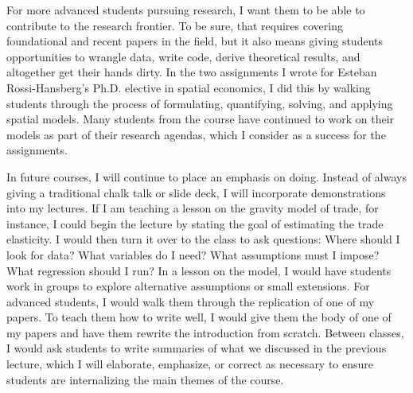 \documentclass{jmstatement}
\begin{document}
For more advanced students pursuing research, I want them to be able to contribute
to the research frontier.
To be sure, that requires covering foundational and recent papers in the field,
but it also means giving students opportunities to wrangle data, write code,
derive theoretical results, and altogether get their hands dirty.
In the two assignments I wrote for Esteban Rossi-Hansberg's Ph.D. elective in
spatial economics, I did this by walking students through the process of
formulating, quantifying, solving, and applying spatial models.
Many students from the course have continued to work on their models as part
of their research agendas, which I consider as a success for the assignments.


In future courses, I will continue to place an emphasis on doing.
Instead of always giving a traditional chalk talk or slide deck, I will incorporate
demonstrations into my lectures.
If I am teaching a lesson on the gravity model of trade, for instance,
I could begin the lecture by stating the goal of estimating the trade elasticity.
I would then turn it over to the class to ask questions:
Where should I look for data?
What variables do I need?
What assumptions must I impose?
What regression should I run?
In a lesson on the \citet{EatonKortum2002} model, I would have students work
in groups to explore alternative assumptions or small extensions.
For advanced students, I would walk them through the replication of one of my
papers. To teach them how to write well, I would give them the body
of one of my papers and have them rewrite the introduction from scratch.
Between classes, I would ask students to write summaries of what we discussed
in the previous lecture, which I will elaborate, emphasize, or correct as necessary
to ensure students are internalizing the main themes of the course.
\end{document}
